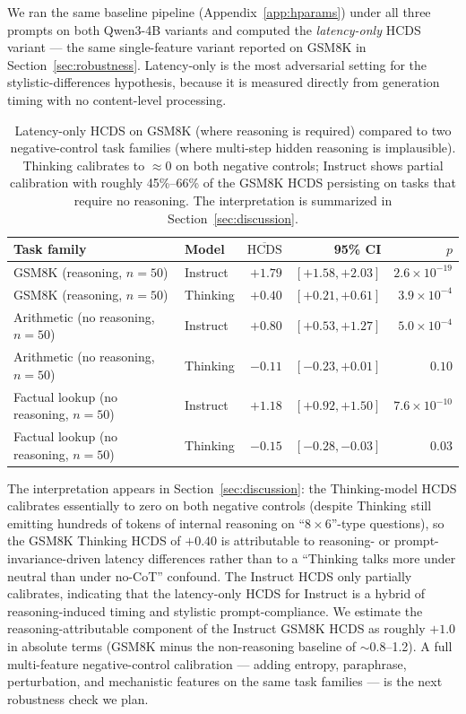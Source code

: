 \documentclass{article}
\theoremstyle{plain}
\theoremstyle{definition}
\theoremstyle{remark}
\begin{document}
We ran the same baseline pipeline (Appendix~\ref{app:hparams}) under
all three prompts on both Qwen3-4B variants and computed the
\emph{latency-only} HCDS variant --- the same single-feature variant
reported on GSM8K in Section~\ref{sec:robustness}. Latency-only is the
most adversarial setting for the stylistic-differences hypothesis,
because it is measured directly from generation timing with no
content-level processing.

\begin{table}[t]
\centering
\small
\begin{tabular}{llrrr}
\toprule
Task family & Model & $\overline{\mathrm{HCDS}}$ & 95\% CI & $p$ \\
\midrule
GSM8K (reasoning, $n=50$) & Instruct & $+1.79$ & $[+1.58, +2.03]$ & $2.6 \times 10^{-19}$ \\
GSM8K (reasoning, $n=50$) & Thinking & $+0.40$ & $[+0.21, +0.61]$ & $3.9 \times 10^{-4}$ \\
\midrule
Arithmetic (no reasoning, $n=50$) & Instruct & $+0.80$ & $[+0.53, +1.27]$ & $5.0 \times 10^{-4}$ \\
Arithmetic (no reasoning, $n=50$) & Thinking & $-0.11$ & $[-0.23, +0.01]$ & $0.10$ \\
Factual lookup (no reasoning, $n=50$) & Instruct & $+1.18$ & $[+0.92, +1.50]$ & $7.6 \times 10^{-10}$ \\
Factual lookup (no reasoning, $n=50$) & Thinking & $-0.15$ & $[-0.28, -0.03]$ & $0.03$ \\
\bottomrule
\end{tabular}
\caption{Latency-only HCDS on GSM8K (where reasoning is required)
compared to two negative-control task families (where multi-step
hidden reasoning is implausible). Thinking calibrates to
$\approx 0$ on both negative controls; Instruct shows partial
calibration with roughly 45\%--66\% of the GSM8K HCDS persisting on
tasks that require no reasoning. The interpretation is summarized in
Section~\ref{sec:discussion}.}
\label{tab:negative-control}
\end{table}

The interpretation appears in Section~\ref{sec:discussion}: the
Thinking-model HCDS calibrates essentially to zero on both negative
controls (despite Thinking still emitting hundreds of tokens of
internal reasoning on ``$8 \times 6$''-type questions), so the GSM8K
Thinking HCDS of $+0.40$ is attributable to reasoning- or
prompt-invariance-driven latency differences rather than to a
``Thinking talks more under neutral than under no-CoT'' confound.
The Instruct HCDS only partially calibrates, indicating that the
latency-only HCDS for Instruct is a hybrid of reasoning-induced
timing and stylistic prompt-compliance. We estimate the
reasoning-attributable component of the Instruct GSM8K HCDS as
roughly $+1.0$ in absolute terms (GSM8K minus the non-reasoning
baseline of $\sim$0.8--1.2). A full multi-feature negative-control
calibration --- adding entropy, paraphrase, perturbation, and
mechanistic features on the same task families --- is the next
robustness check we plan.
\end{document}
